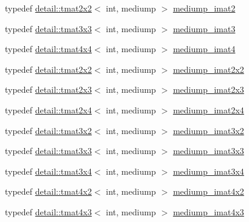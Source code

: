 \begin{DoxyCompactItemize}
\item 
typedef \hyperlink{structglm_1_1detail_1_1tmat2x2}{detail\+::tmat2x2}$<$ int, mediump $>$ \hyperlink{group__gtc__matrix__integer_gaec03a8eef2ec2536f8bebffd0bac8192}{mediump\+\_\+imat2}
\item 
typedef \hyperlink{structglm_1_1detail_1_1tmat3x3}{detail\+::tmat3x3}$<$ int, mediump $>$ \hyperlink{group__gtc__matrix__integer_ga6b438ab863af0122b532adc93b89105e}{mediump\+\_\+imat3}
\item 
typedef \hyperlink{structglm_1_1detail_1_1tmat4x4}{detail\+::tmat4x4}$<$ int, mediump $>$ \hyperlink{group__gtc__matrix__integer_gabf1a0fd4c85a21f67535b737e1feb355}{mediump\+\_\+imat4}
\item 
typedef \hyperlink{structglm_1_1detail_1_1tmat2x2}{detail\+::tmat2x2}$<$ int, mediump $>$ \hyperlink{group__gtc__matrix__integer_ga472222f6e3754124ee9cb64acaaedac1}{mediump\+\_\+imat2x2}
\item 
typedef \hyperlink{structglm_1_1detail_1_1tmat2x3}{detail\+::tmat2x3}$<$ int, mediump $>$ \hyperlink{group__gtc__matrix__integer_gabc92c714c2d257213c5b0771669df177}{mediump\+\_\+imat2x3}
\item 
typedef \hyperlink{structglm_1_1detail_1_1tmat2x4}{detail\+::tmat2x4}$<$ int, mediump $>$ \hyperlink{group__gtc__matrix__integer_ga90b020de8489a1d4424c0ffcc17c83dd}{mediump\+\_\+imat2x4}
\item 
typedef \hyperlink{structglm_1_1detail_1_1tmat3x2}{detail\+::tmat3x2}$<$ int, mediump $>$ \hyperlink{group__gtc__matrix__integer_ga2a90775c74656b8a825f24d510f0ea5d}{mediump\+\_\+imat3x2}
\item 
typedef \hyperlink{structglm_1_1detail_1_1tmat3x3}{detail\+::tmat3x3}$<$ int, mediump $>$ \hyperlink{group__gtc__matrix__integer_gac5ee8dc182055bb0a00a90c031d4a714}{mediump\+\_\+imat3x3}
\item 
typedef \hyperlink{structglm_1_1detail_1_1tmat3x4}{detail\+::tmat3x4}$<$ int, mediump $>$ \hyperlink{group__gtc__matrix__integer_gaaac79be4db34dde570c3331ffe728d55}{mediump\+\_\+imat3x4}
\item 
typedef \hyperlink{structglm_1_1detail_1_1tmat4x2}{detail\+::tmat4x2}$<$ int, mediump $>$ \hyperlink{group__gtc__matrix__integer_gacdae7d6ae4820756c62c2b5fd5c0370a}{mediump\+\_\+imat4x2}
\item 
typedef \hyperlink{structglm_1_1detail_1_1tmat4x3}{detail\+::tmat4x3}$<$ int, mediump $>$ \hyperlink{group__gtc__matrix__integer_ga5032ee978a55aa0db4842d5c3cbeade0}{mediump\+\_\+imat4x3}
\item 

\end{DoxyCompactItemize}
